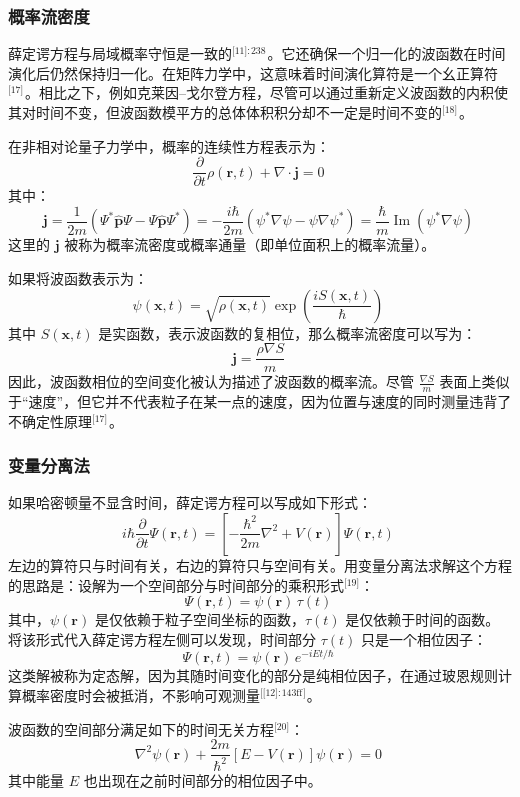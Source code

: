 \subsubsection{概率流密度}
薛定谔方程与局域概率守恒是一致的\(^\text{[11]: 238 }\)。它还确保一个归一化的波函数在时间演化后仍然保持归一化。在矩阵力学中，这意味着时间演化算符是一个幺正算符\(^\text{[17]}\) 。相比之下，例如克莱因–戈尔登方程，尽管可以通过重新定义波函数的内积使其对时间不变，但波函数模平方的总体体积积分却不一定是时间不变的\(^\text{[18]}\) 。

在非相对论量子力学中，概率的连续性方程表示为：
$$
\frac{\partial}{\partial t} \rho(\mathbf{r}, t) + \nabla \cdot \mathbf{j} = 0~
$$
其中：
$$
\mathbf{j} = \frac{1}{2m} \left( \Psi^* \hat{\mathbf{p}} \Psi - \Psi \hat{\mathbf{p}} \Psi^* \right)
= -\frac{i\hbar}{2m} \left( \psi^* \nabla \psi - \psi \nabla \psi^* \right)
= \frac{\hbar}{m} \operatorname{Im}(\psi^* \nabla \psi)~
$$
这里的 $\mathbf{j}$ 被称为概率流密度或概率通量（即单位面积上的概率流量）。

如果将波函数表示为：
$$
\psi(\mathbf{x}, t) = \sqrt{\rho(\mathbf{x}, t)} \exp\left( \frac{i S(\mathbf{x}, t)}{\hbar} \right)~
$$
其中 $S(\mathbf{x}, t)$ 是实函数，表示波函数的复相位，那么概率流密度可以写为：
$$
\mathbf{j} = \frac{\rho \nabla S}{m}~
$$
因此，波函数相位的空间变化被认为描述了波函数的概率流。尽管 $\frac{\nabla S}{m}$ 表面上类似于“速度”，但它并不代表粒子在某一点的速度，因为位置与速度的同时测量违背了不确定性原理\(^\text{[17]}\) 。
\subsubsection{变量分离法}
如果哈密顿量不显含时间，薛定谔方程可以写成如下形式：
$$
i\hbar \frac{\partial}{\partial t} \Psi(\mathbf{r}, t) = \left[-\frac{\hbar^2}{2m} \nabla^2 + V(\mathbf{r})\right] \Psi(\mathbf{r}, t)~
$$
左边的算符只与时间有关，右边的算符只与空间有关。用变量分离法求解这个方程的思路是：设解为一个空间部分与时间部分的乘积形式\(^\text{[19]}\)：
$$
\Psi(\mathbf{r}, t) = \psi(\mathbf{r}) \, \tau(t)~
$$
其中，$\psi(\mathbf{r})$ 是仅依赖于粒子空间坐标的函数，$\tau(t)$ 是仅依赖于时间的函数。将该形式代入薛定谔方程左侧可以发现，时间部分 $\tau(t)$ 只是一个相位因子：
$$
\Psi(\mathbf{r}, t) = \psi(\mathbf{r}) \, e^{-iEt/\hbar}~
$$
这类解被称为定态解，因为其随时间变化的部分是纯相位因子，在通过玻恩规则计算概率密度时会被抵消，不影响可观测量\(^\text{[[12]: 143ff ]}\)。

波函数的空间部分满足如下的时间无关方程\(^\text{[20]}\)：
$$
\nabla^2 \psi(\mathbf{r}) + \frac{2m}{\hbar^2} [E - V(\mathbf{r})] \psi(\mathbf{r}) = 0~
$$
其中能量 $E$ 也出现在之前时间部分的相位因子中。

